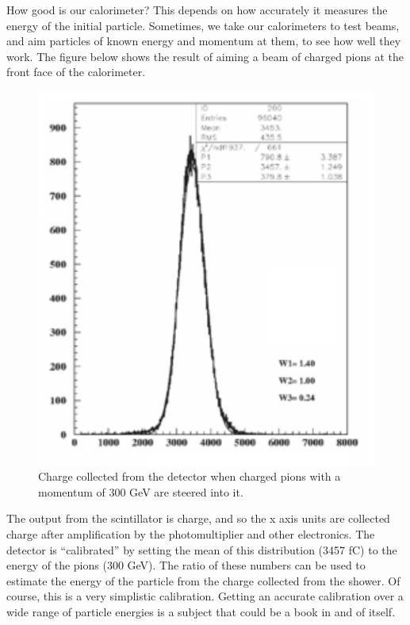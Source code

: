 \noindent
How good is our calorimeter? This depends on how accurately it measures the energy of the initial particle. Sometimes, we take our calorimeters to test beams, and aim particles of known energy and momentum at them, to see how well they work. The figure below shows the result of aiming a beam of charged pions at the front face of the calorimeter.

\;
\;

\begin{figure}[h]
\centering\includegraphics[scale=0.5]{./calorimetry/Pictures/fig7.pdf}
\caption{Charge collected from the detector when charged pions with a momentum of 300 GeV are steered into it.}
\label{fig:cal7}
\end{figure}

\;

\noindent
The output from the scintillator is charge, and so the x axis units are collected charge after amplification by the photomultiplier and other electronics. The detector is ``calibrated'' by setting the mean of this distribution (3457 fC) to the energy of the pions (300 GeV). The ratio of these numbers can be used to estimate the energy of the particle from the charge collected from the shower.  Of course, this is a very simplistic calibration. Getting an accurate calibration over a wide range of particle energies is a subject that could be a book in and of itself. 

